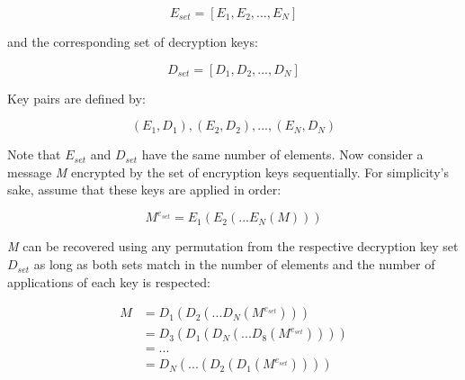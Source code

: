 \documentclass[../access.tex]{subfiles}
\begin{document}
            \begin{equation}
                E_{set} = [E_{1}, E_{2}, ..., E_{N}]
            \end{equation}
            
            and the corresponding set of decryption keys: 
            
            \begin{equation}
                D_{set} = [D_{1}, D_{2}, ..., D_{N}]
            \end{equation}    
                
            Key pairs are defined by: 
            
            \begin{equation}
                (E_{1}, D_{1}), (E_{2}, D_{2}), ..., (E_{N}, D_{N})
            \end{equation}
            
            Note that $ E_{set} $ and $ D_{set} $ have the same number of elements.
            Now consider a message \textit{M} encrypted by the set of encryption keys sequentially. For simplicity’s sake, assume that these keys are applied in order: 

            \begin{equation}
                M^{e_{set}} = E_{1}(E_{2}(... E_{N}(M)))
            \end{equation}
            
            \textit{M} can be recovered using any permutation from the respective decryption key set $ D_{set} $ as long as both sets match in the number of elements and the number of applications of each key is respected:
            
            \begin{equation}
                \begin{aligned}
                    M   &= D_{1}(D_{2}(...D_{N}(M^{e_{set}}))) \\ 
                        &= D_{3}(D_{1}(D_{N}(...D_{8}(M^{e_{set}}))))\\ 
                        &= ... \\
                        &= D_{N}(...(D_{2}(D_{1}(M^{e_{set}}))))
                \end{aligned}
            \end{equation}
            
\end{document}
